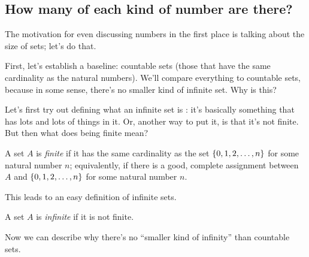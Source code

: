\subsection{How many of each kind of number are there?}

The motivation for even discussing numbers in the first place is talking about the size of sets; let's do that.

First, let's establish a baseline: countable sets (those that have the same cardinality as the natural numbers).
We'll compare everything to countable sets, because in some sense, there's no smaller kind of infinite set.
Why is this?

Let's first try out defining what an infinite set is : it's basically something that has lots and lots of things in it.
Or, another way to put it, is that it's not finite.
But then what does being finite mean?

\begin{definition}
    A set $A$ is \emph{finite} if it has the same cardinality as the set ${\left\{ {0, 1, 2, \ldots, n} \right\}}$ for some natural number $n$; equivalently, if there is a good, complete assignment between $A$ and ${\left\{ {0, 1, 2, \ldots, n} \right\}}$ for some natural number $n$.
\end{definition}

This leads to an easy definition of infinite sets.

\begin{definition}
    A set $A$ is \emph{infinite} if it is not finite.
\end{definition}

Now we can describe why there's no ``smaller kind of infinity'' than countable sets.

